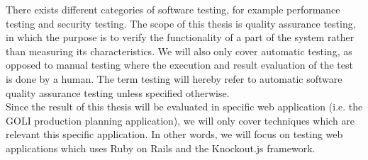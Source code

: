 There exists different categories of software testing, for example
performance testing and security testing. The scope of this thesis is
quality assurance testing, in which the purpose is to verify the
functionality of a part of the system rather than measuring its
characteristics. We will also only cover automatic testing, as opposed
to manual testing where the execution and result evaluation of the test
is done by a human. The term testing will hereby refer to automatic
software quality assurance testing unless specified otherwise.\\

Since the result of this thesis will be evaluated in specific web
application (i.e. the GOLI production planning application), we will
only cover techniques which are relevant this specific application. In
other words, we will focus on testing web applications which uses Ruby
on Rails and the Knockout.js framework.\\

